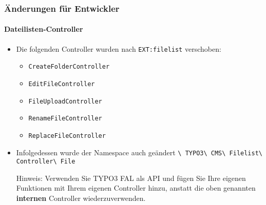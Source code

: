 
\begin{frame}[fragile]
	\frametitle{Änderungen für Entwickler}
	\framesubtitle{Dateilisten-Controller}

	\begin{itemize}
		\item Die folgenden Controller wurden nach  \texttt{EXT:filelist} verschoben:

			\begin{itemize}\small
				\item \texttt{CreateFolderController}
				\item \texttt{EditFileController}
				\item \texttt{FileUploadController}
				\item \texttt{RenameFileController}
				\item \texttt{ReplaceFileController}
			\end{itemize}\normalsize

		\item Infolgedessen wurde der Namespace auch geändert\newline
			\texttt{\textbackslash
				TYPO3\textbackslash
				CMS\textbackslash
				Filelist\textbackslash
				Controller\textbackslash
				File}

		\vspace{0.2cm}

		\small
			Hinweis: Verwenden Sie TYPO3 FAL als API und fügen Sie Ihre 
			eigenen Funktionen mit Ihrem eigenen Controller hinzu, anstatt die oben genannten
			\textbf{internen} Controller wiederzuverwenden.
		\normalsize

	\end{itemize}

\end{frame}


